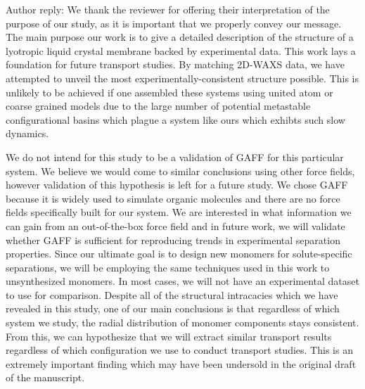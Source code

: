 \documentclass{article}
\begin{document}
\begin{enumerate}
\begin{quote}
    \end{quote}

    Author reply: We thank the reviewer for offering their interpretation
    of the purpose of our study, as it is important that we properly convey our
    message. The main purpose our work is to give a detailed description of the
    structure of a lyotropic liquid crystal membrane backed by experimental data.
    This work lays a foundation for future transport studies. By matching 2D-WAXS
    data, we have attempted to unveil the most experimentally-consistent structure
    possible. This is unlikely to be achieved if one assembled these systems using
    united atom or coarse grained models due to the large number of potential
    metastable configurational basins which plague a system like ours which exhibts
    such slow dynamics.

    We do not intend for this study to be a validation of GAFF for this
    particular system. We believe we would come to similar conclusions using other
    force fields, however validation of this hypothesis is left for a future study.
    We chose GAFF because it is widely used to simulate organic molecules and there
    are no force fields specifically built for our system. We are interested in
    what information we can gain from an out-of-the-box force field and in future
    work, we will validate whether GAFF is sufficient for reproducing trends in
    experimental separation properties. Since our ultimate goal is to design new
    monomers for solute-specific separations, we will be employing the same 
    techniques used in this work to unsynthesized monomers. In most cases, we will
    not have an experimental dataset to use for comparison. Despite all of the 
    structural intracacies which we have revealed in this study, one of our main
    conclusions is that regardless of which system we study, the radial distribution
    of monomer components stays consistent. From this, we can hypothesize that 
    we will extract similar transport results regardless of which configuration
    we use to conduct transport studies. This is an extremely important finding
    which may have been undersold in the original draft of the manuscript. 
	
	

\end{enumerate}
\end{document}
